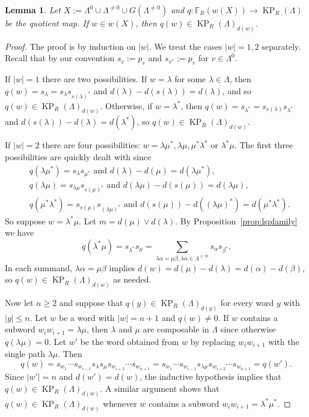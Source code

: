 \documentclass[a4paper,12pt]{amsart}
\numberwithin{equation}{section}
\newtheorem{lemma}[thm]{Lemma}
\theoremstyle{definition}
\theoremstyle{remark}
\begin{document}
\begin{lemma}Let $X:=\Lambda^0 \cup \Lambda^{\neq 0} \cup G(\Lambda^{\neq 0})$ and  
$q:{\mathbb{F}}_R(w(X)) \to  \operatorname{KP}_R(\Lambda) $ be the quotient map.
If $w\in w(X)$, then $q(w)\in \operatorname{KP}_R(\Lambda)_{d(w)}$. 
\end{lemma} 

\begin{proof} The proof is by induction on $|w|$. We treat the cases $|w|=1,2$ separately. Recall that by our convention  $s_v:=p_v$ and $s_{v^*}:=p_v$ for $v\in \Lambda^0$.

 If $|w|=1$ there are two possibilities.   If $w=\lambda$ for some $\lambda\in \Lambda$, then $q(w)=s_\lambda=s_\lambda s_{s(\lambda)^*}$ and $d(\lambda)-d(s(\lambda))=d(\lambda)$, and so 
$q(w)\in \operatorname{KP}_R(\Lambda)_{d(w)}$.  Otherwise,  if $w=\lambda^*$,  then $q(w)=s_{\lambda^*}=s_{s(\lambda)}s_{\lambda^*}$ and $d(s(\lambda))-d(\lambda)=d(\lambda^*)$, so $q(w)\in \operatorname{KP}_R(\Lambda)_{d(w)}$. 

 If $|w|=2$ there are four possibilities: $w=\lambda\mu^*,  \lambda\mu, \mu^*\lambda^*$  or $\lambda^*\mu$. The first three possibilities are quickly dealt with since
 \begin{align*}
& q(\lambda\mu^*)=s_\lambda s_{\mu^*}\text{\ and \ } d(\lambda)-d(\mu)=d(\lambda\mu^*),\\
& q(\lambda\mu)=s_{\lambda\mu} s_{s(\mu)^*}\text{\ and \ } d(\lambda\mu)-d(s(\mu))=d(\lambda\mu),\\
& q(\mu^*\lambda^*)=s_{s(\mu)}s_{(\lambda\mu)^*}\text{\ and \ } d(s(\mu))-d((\lambda\mu)^*)=d(\mu^*\lambda^*).
 \end{align*}
 So suppose $w=\lambda^*\mu$. Let $m=d(\mu)\vee d(\lambda)$.  By Proposition~\ref{prop:lspfamily} we have
 \[
 q(\lambda^*\mu)=s_{\lambda^{*}}s_\mu=\sum_{\lambda\alpha=\mu\beta, 
\lambda\alpha \in \Lambda^{\leq m}} s_\alpha s_{\beta^{*}}.
 \]
In each summand, $\lambda\alpha=\mu\beta$ implies $d(w)=d(\mu)-d(\lambda)=d(\alpha)-d(\beta)$, so $q(w)\in \operatorname{KP}_R(\Lambda)_{d(w)}$ as needed. 

Now let $n\geq 2$ and suppose that $q(y)\in  \operatorname{KP}_R(\Lambda)_{d(y)}$ for every word $y$ with $|y|\leq n$. Let $w$ be a word with $|w|=n+1$ and $q(w)\not=0$. If $w$ contains a subword $w_iw_{i+1}=\lambda\mu$, then  $\lambda$ and $\mu$ are composable in $\Lambda$ since otherwise $q(\lambda\mu)=0$. Let $w'$ be the word obtained from $w$ by replacing $w_iw_{i+1}$ with the single path $\lambda\mu$. Then
\[
q(w)=s_{w_1}\cdots s_{w_{i-1}}s_{\lambda}s_{\mu}s_{w_{i+2}}\cdots s_{w_{n+1}}
=s_{w_1}\cdots s_{w_{i-1}}s_{\lambda\mu}s_{w_{i+2}}\cdots s_{w_{n+1}}=q(w').
\]
Since $|w'|=n$ and $d(w')=d(w)$, the inductive hypothesis implies that $q(w)\in \operatorname{KP}_R(\Lambda)_{d(w)}$. A similar argument shows that $q(w)\in \operatorname{KP}_R(\Lambda)_{d(w)}$ whenever $w$ contains a subword $w_iw_{i+1}=\lambda^*\mu^*$.


\end{proof}
\end{document}
